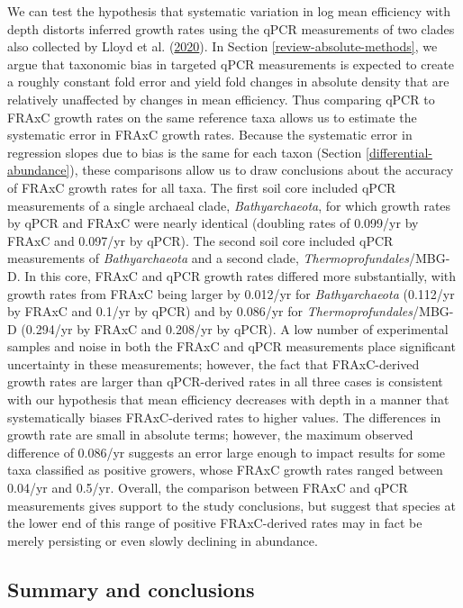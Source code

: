 \documentclass[
]{article}
\begin{document}
We can test the hypothesis that systematic variation in log mean efficiency with depth distorts inferred growth rates using the qPCR measurements of two clades also collected by Lloyd et al. (\protect\hyperlink{ref-lloyd2020evid}{2020}).
In Section \ref{review-absolute-methods}, we argue that taxonomic bias in targeted qPCR measurements is expected to create a roughly constant fold error and yield fold changes in absolute density that are relatively unaffected by changes in mean efficiency.
Thus comparing qPCR to FRAxC growth rates on the same reference taxa allows us to estimate the systematic error in FRAxC growth rates.
Because the systematic error in regression slopes due to bias is the same for each taxon (Section \ref{differential-abundance}), these comparisons allow us to draw conclusions about the accuracy of FRAxC growth rates for all taxa.
The first soil core included qPCR measurements of a single archaeal clade, \emph{Bathyarchaeota}, for which growth rates by qPCR and FRAxC were nearly identical (doubling rates of 0.099/yr by FRAxC and 0.097/yr by qPCR).
The second soil core included qPCR measurements of \emph{Bathyarchaeota} and a second clade, \emph{Thermoprofundales}/MBG-D.
In this core, FRAxC and qPCR growth rates differed more substantially, with growth rates from FRAxC being larger by 0.012/yr for \emph{Bathyarchaeota} (0.112/yr by FRAxC and 0.1/yr by qPCR) and by 0.086/yr for \emph{Thermoprofundales}/MBG-D (0.294/yr by FRAxC and 0.208/yr by qPCR).
A low number of experimental samples and noise in both the FRAxC and qPCR measurements place significant uncertainty in these measurements; however, the fact that FRAxC-derived growth rates are larger than qPCR-derived rates in all three cases is consistent with our hypothesis that mean efficiency decreases with depth in a manner that systematically biases FRAxC-derived rates to higher values.
The differences in growth rate are small in absolute terms; however, the maximum observed difference of 0.086/yr suggests an error large enough to impact results for some taxa classified as positive growers, whose FRAxC growth rates ranged between 0.04/yr and 0.5/yr.
Overall, the comparison between FRAxC and qPCR measurements gives support to the study conclusions, but suggest that species at the lower end of this range of positive FRAxC-derived rates may in fact be merely persisting or even slowly declining in abundance.

\hypertarget{summary-and-conclusions}{%
\subsection{Summary and conclusions}\label{summary-and-conclusions}}
\end{document}
